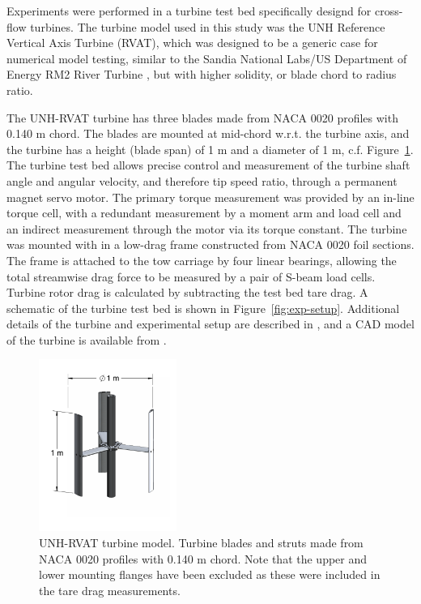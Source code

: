 \documentclass[energies,article,accept,moreauthors,pdftex,12pt,a4paper]{mdpi}
\begin{document}
Experiments were performed in a turbine test bed specifically designd for
cross-flow turbines. The turbine model used in this study was the UNH Reference
Vertical Axis Turbine (RVAT), which was designed to be a generic case for
numerical model testing, similar to the Sandia National Labs/US Department of
Energy RM2 River Turbine \cite{Neary2014}, but with higher solidity, or blade
chord to radius ratio.

The UNH-RVAT turbine has three blades made from NACA 0020 profiles with 0.140 m
chord. The blades are mounted at mid-chord w.r.t. the turbine axis, and the
turbine has a height (blade span) of 1 m and a diameter of 1 m, c.f.
Figure~\ref{fig:turbine}. The turbine test bed allows precise control and
measurement of the turbine shaft angle and angular velocity, and therefore tip
speed ratio, through a permanent magnet servo motor. The primary torque
measurement was provided by an in-line torque cell, with a redundant measurement
by a moment arm and load cell and an indirect measurement through the motor via
its torque constant. The turbine was mounted with in a low-drag frame
constructed from NACA 0020 foil sections.  The frame is attached to the tow
carriage by four linear bearings, allowing the total streamwise drag force to be
measured by a pair of S-beam load cells. Turbine rotor drag is calculated by
subtracting the test bed tare drag. A schematic of the turbine test bed is shown
in Figure~\ref{fig:exp-setup}. Additional details of the turbine and
experimental setup are described in \cite{Bachant2015-JoT}, and a CAD model of
the turbine is available from \cite{Bachant2014-RVAT-CAD}.

\begin{figure}[ht!]
\centering

\includegraphics[width=0.4\textwidth]{figures/turbine}

\caption{UNH-RVAT turbine model. Turbine blades and struts made from NACA 0020
    profiles with 0.140 m chord. Note that the upper and lower mounting flanges have
    been excluded as these were included in the tare drag measurements.}

\label{fig:turbine}
\end{figure}
\end{document}
